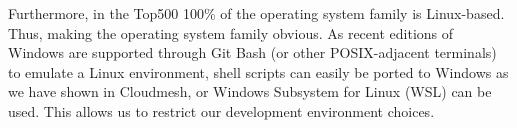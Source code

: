 \documentclass[utf8]{FrontiersinVancouver} %
\def\overleafhome{/tmp}%
\begin{document}
Furthermore, in the Top500 100\% of the operating system family is Linux-based. Thus, making the operating system family obvious. As recent editions of Windows are supported through Git Bash (or other POSIX-adjacent terminals) to emulate a Linux environment, shell scripts
can easily be ported to Windows as we have shown in Cloudmesh, or
Windows Subsystem for Linux (WSL) can be used.  This allows us to restrict our development environment choices.




\newenvironment{BOX}[1][title]
{
    \ifx\homepath\overleafhome
        \bigskip
        \begin{quote}
        \begin{mdframed}[hidealllines=true,backgroundcolor=yellow!20]
        \noindent\rule{\linewidth}{0.4pt}
        {\bf #1}
    \else
        \begin{tcolorbox}[title=#1]
    \fi
}
{
    \ifx\homepath\overleafhome
        \noindent\rule{\linewidth}{0.4pt}
        \end{mdframed}
        \end{quote}
    \else
        \end{tcolorbox}
    \fi
}
\end{document}
